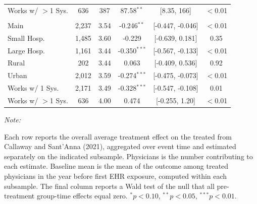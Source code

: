 \begin{table}[!h]
\begin{threeparttable}
\begin{tabular}[t]{lccccc}
\hspace{1em}\quad Works w/ $>$1 Sys. & 636 & 387 & 87.58$^{**}$ & {}[8.35, 166] & $<$0.01\\
\addlinespace[0.3em]
\multicolumn{6}{l}{\textbf{Claims per Patient}}\\
\hspace{1em}\quad Main & 2,237 & 3.54 & -0.246$^{**}$ & {}[-0.447, -0.046] & $<$0.01\\
\hspace{1em}\quad Small Hosp. & 1,485 & 3.60 & -0.229 & {}[-0.639, 0.181] & 0.35\\
\hspace{1em}\quad Large Hosp. & 1,161 & 3.44 & -0.350$^{***}$ & {}[-0.567, -0.133] & $<$0.01\\
\hspace{1em}\quad Rural & 202 & 3.44 & 0.063 & {}[-0.409, 0.536] & 0.92\\
\hspace{1em}\quad Urban & 2,012 & 3.59 & -0.274$^{***}$ & {}[-0.475, -0.073] & $<$0.01\\
\hspace{1em}\quad Works w/ 1 Sys. & 2,171 & 3.49 & -0.328$^{***}$ & {}[-0.547, -0.108] & 0.01\\
\hspace{1em}\quad Works w/ $>$1 Sys. & 636 & 4.00 & 0.474 & {}[-0.255, 1.20] & $<$0.01\\
\bottomrule
\end{tabular}
\begin{tablenotes}
\item \textit{Note: } 
\item Each row reports the overall average treatment effect on the treated from Callaway and Sant'Anna (2021), aggregated over event time and estimated separately on the indicated subsample. Physicians is the number contributing to each estimate. Baseline mean is the mean of the outcome among treated physicians in the year before first EHR exposure, computed within each subsample. The final column reports a Wald test of the null that all pre-treatment group-time effects equal zero. $^{*}p<0.10$, $^{**}p<0.05$, $^{***}p<0.01$.
\end{tablenotes}
\end{threeparttable}
\end{table}
